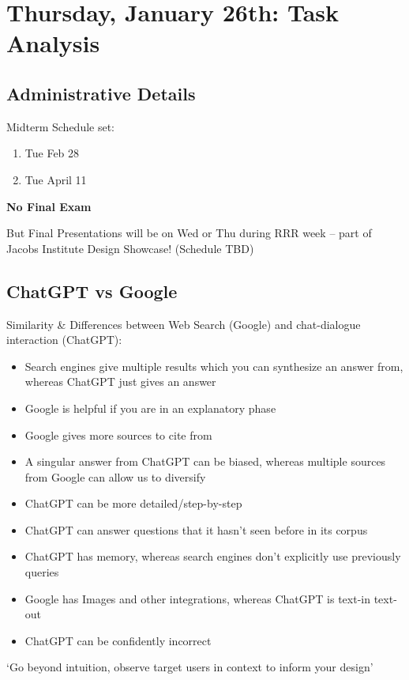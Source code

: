 \section{Thursday, January 26th: Task Analysis}
\subsection{Administrative Details}
Midterm Schedule set:
\begin{enumerate}
    \item Tue Feb 28
    \item Tue April 11
\end{enumerate}
\textbf{No Final Exam}

But Final Presentations will be on Wed or Thu during RRR week -- part of Jacobs Institute Design Showcase! (Schedule TBD)

\subsection{ChatGPT vs Google}
Similarity \& Differences between Web Search (Google) and chat-dialogue interaction (ChatGPT):
\begin{itemize}
    \item Search engines give multiple results which you can synthesize an answer from, whereas ChatGPT just gives an answer
    \item Google is helpful if you are in an explanatory phase
    \item Google gives more sources to cite from
    \item A singular answer from ChatGPT can be biased, whereas multiple sources from Google can allow us to diversify
    \item ChatGPT can be more detailed/step-by-step
    \item ChatGPT can answer questions that it hasn't seen before  in its corpus
    \item ChatGPT has memory, whereas search engines don't explicitly use previously queries
    \item Google has Images and other integrations, whereas ChatGPT is text-in text-out
    \item ChatGPT can be confidently incorrect
\end{itemize}

\begin{shaded}
`Go beyond intuition, observe target users in context to inform your design'
\end{shaded}

